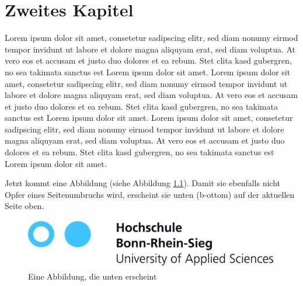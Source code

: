 \chapter{Zweites Kapitel}
Lorem ipsum dolor sit amet, consetetur sadipscing elitr, sed diam nonumy eirmod tempor invidunt ut labore et dolore magna aliquyam erat, sed diam voluptua. At vero eos et accusam et justo duo dolores et ea rebum. Stet clita kasd gubergren, no sea takimata sanctus est Lorem ipsum dolor sit amet. Lorem ipsum dolor sit amet, consetetur sadipscing elitr, sed diam nonumy eirmod tempor invidunt ut labore et dolore magna aliquyam erat, sed diam voluptua. At vero eos et accusam et justo duo dolores et ea rebum. Stet clita kasd gubergren, no sea takimata sanctus est Lorem ipsum dolor sit amet. Lorem ipsum dolor sit amet, consetetur sadipscing elitr, sed diam nonumy eirmod tempor invidunt ut labore et dolore magna aliquyam erat, sed diam voluptua. At vero eos et accusam et justo duo dolores et ea rebum. Stet clita kasd gubergren, no sea takimata sanctus est Lorem ipsum dolor sit amet.

Jetzt kommt eine Abbildung (siehe Abbildung \ref{figure01}). Damit sie ebenfalls nicht Opfer eines Seitenumbruchs wird, erscheint sie unten (b-ottom) auf der aktuellen Seite oben.

\begin{figure}[b]

\begin{center}
  	\includegraphics[scale=1]{images/Logo_H-BRS.jpg}
\end{center}

\caption{Eine Abbildung, die unten erscheint}
\label{figure01}
\end{figure} 

